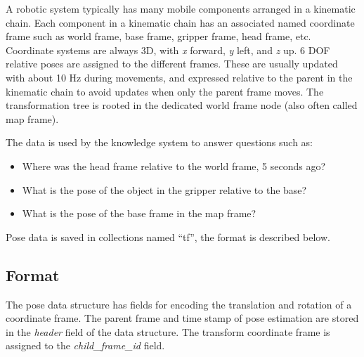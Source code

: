 
A robotic system typically has many mobile components arranged in a kinematic chain.
Each component in a kinematic chain has an associated named coordinate frame such as
world frame, base frame, gripper frame, head frame, etc.
Coordinate systems are always 3D, with \emph{x} forward, \emph{y} left, and \emph{z} up.
6 DOF relative poses are assigned to the different frames.
These are usually updated with about 10 Hz during movements, and
expressed relative to the 
parent in the kinematic chain to avoid updates when only the parent frame moves.
The transformation tree is rooted in the dedicated world frame node
(also often called map frame).

The data is used by the \ease knowledge system to answer questions such as:
\begin{itemize}
 \item Where was the head frame relative to the world frame, 5 seconds ago?
 \item What is the pose of the object in the gripper relative to the base?
 \item What is the pose of the base frame in the map frame? 
\end{itemize}


Pose data is saved in \mongodb collections named ``tf'', the format is described below.

\subsection{Format}
The pose data structure has
fields for encoding the translation and rotation of a coordinate frame.
The parent frame and time stamp of pose estimation
are stored in the \emph{header} field of the data structure.
The transform coordinate frame is assigned to the \emph{child\_frame\_id} field. \\


